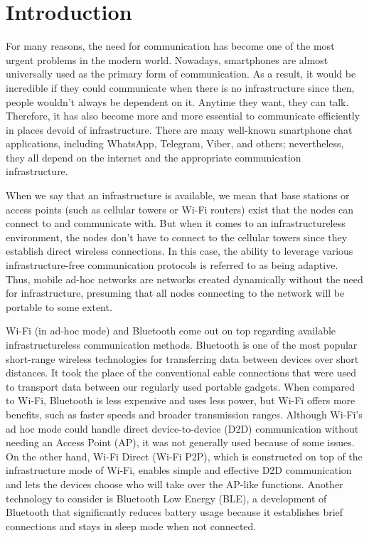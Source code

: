 \section{Introduction}

For many reasons, the need for communication has become one of the most urgent
problems in the modern world. Nowadays, smartphones are almost universally used
as the primary form of communication. As a result, it would be incredible if
they could communicate when there is no infrastructure since then, people
wouldn't always be dependent on it. Anytime they want, they can talk.
Therefore, it has also become more and more essential to communicate
efficiently in places devoid of infrastructure. There are many well-known
smartphone chat applications, including WhatsApp, Telegram, Viber, and others;
nevertheless, they all depend on the internet and the appropriate communication
infrastructure.

When we say that an infrastructure is available, we mean that base stations or
access points (such as cellular towers or Wi-Fi routers) exist that the nodes
can connect to and communicate with. But when it comes to an
infrastructureless environment, the nodes don’t have to connect to the
cellular towers since they establish direct wireless connections. In this case,
the ability to leverage various infrastructure-free communication protocols is
referred to as being adaptive. Thus, mobile ad-hoc networks are networks
created dynamically without the need for infrastructure, presuming that all
nodes connecting to the network will be portable to some
extent\cite{chlamtac2003}.

Wi-Fi (in ad-hoc mode) and Bluetooth come out on top regarding available
infrastructureless communication methods. Bluetooth is one of the most popular
short-range wireless technologies for transferring data between devices over
short distances. It took the place of the conventional cable connections that
were used to transport data between our regularly used portable gadgets. When
compared to Wi-Fi, Bluetooth is less expensive and uses less power, but Wi-Fi
offers more benefits, such as faster speeds and broader transmission ranges.
Although Wi-Fi's ad hoc mode could handle direct device-to-device (D2D)
communication without needing an Access Point (AP), it was not generally used
because of some issues. On the other hand, Wi-Fi Direct (Wi-Fi P2P), which is
constructed on top of the infrastructure mode of Wi-Fi, enables simple and
effective D2D communication and lets the devices choose who will take over the
AP-like functions. Another technology to consider is Bluetooth Low Energy
(BLE), a development of Bluetooth that significantly reduces battery usage
because it establishes brief connections and stays in sleep mode when not
connected.

